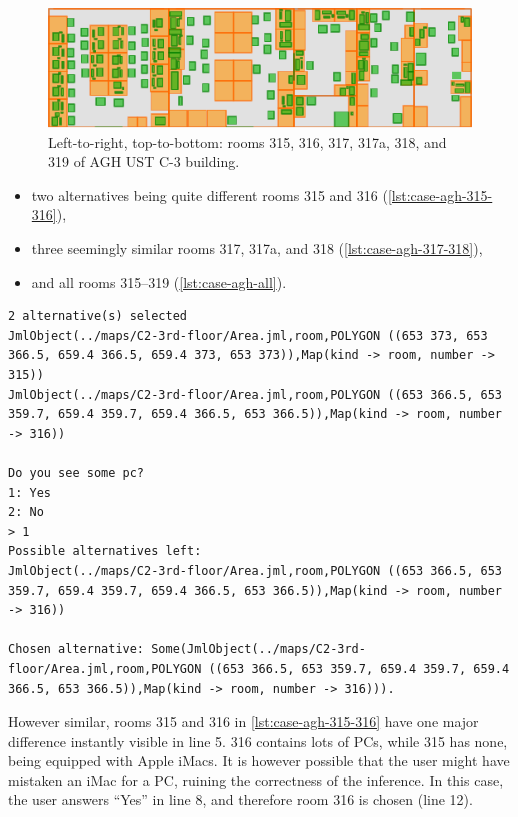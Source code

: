 \begin{figure}
	\centering
	\includegraphics[width=\textwidth]{case-agh-rooms}
	\caption{Left-to-right, top-to-bottom: rooms 315, 316, 317, 317a, 318, and 319 of AGH UST C-3 building.}
	\label{fig:case-agh-rooms}
\end{figure}

\begin{itemize}
	\item two alternatives being quite different rooms 315 and 316 (\cref{lst:case-agh-315-316}),
	\item three seemingly similar rooms 317, 317a, and 318 (\cref{lst:case-agh-317-318}),
	\item and all rooms 315--319 (\cref{lst:case-agh-all}).
\end{itemize}

\begin{lstlisting}[label={lst:case-agh-315-316},caption={Mediation between rooms 315 and 316.}]
2 alternative(s) selected
JmlObject(../maps/C2-3rd-floor/Area.jml,room,POLYGON ((653 373, 653 366.5, 659.4 366.5, 659.4 373, 653 373)),Map(kind -> room, number -> 315))
JmlObject(../maps/C2-3rd-floor/Area.jml,room,POLYGON ((653 366.5, 653 359.7, 659.4 359.7, 659.4 366.5, 653 366.5)),Map(kind -> room, number -> 316))

Do you see some pc?
1: Yes
2: No
> 1
Possible alternatives left:
JmlObject(../maps/C2-3rd-floor/Area.jml,room,POLYGON ((653 366.5, 653 359.7, 659.4 359.7, 659.4 366.5, 653 366.5)),Map(kind -> room, number -> 316))

Chosen alternative: Some(JmlObject(../maps/C2-3rd-floor/Area.jml,room,POLYGON ((653 366.5, 653 359.7, 659.4 359.7, 659.4 366.5, 653 366.5)),Map(kind -> room, number -> 316))).
\end{lstlisting}

However similar, rooms 315 and 316 in \cref{lst:case-agh-315-316} have one major difference instantly visible in line 5. 316 contains lots of PCs, while 315 has none, being equipped with Apple iMacs. It is however possible that the user might have mistaken an iMac for a PC, ruining the correctness of the inference. In this case, the user answers ``Yes'' in line 8, and therefore room 316 is chosen (line 12).


